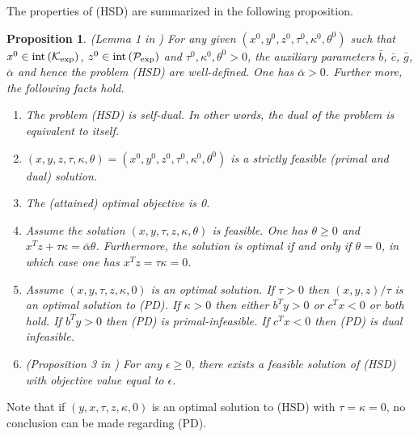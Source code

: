 \documentclass[10pt]{article}
\theoremstyle{definition}
\theoremstyle{plain}
\newtheorem{prop}{Proposition}
\def\interior{\protect{\textnormal{int}}}
\begin{document}
The properties of (HSD) are summarized in the following proposition.
\begin{prop}\label{properties_HSD} \textnormal{(Lemma 1 in \cite{Freund_behavior_HSD})}
	For any given $(x^0, y^0, z^0, \tau^0, \kappa^0, \theta^0)$ such that $x^0 \in \interior \left(\mathcal{K}_{\exp}\right)$, $z^0 \in \interior \left(\mathcal{P}_{\exp}\right)$ and $\tau^0, \kappa^0, \theta^0 > 0$, the auxiliary parameters $\bar{b}$, $\bar{c}$, $\bar{g}$, $\bar{\alpha}$ and hence the problem (HSD) are well-defined. One has $\bar{\alpha}>0$. Further more, the following facts hold.
	\begin{enumerate}
		\item The problem (HSD) is \textnormal{self-dual}. In other words, the dual of the problem is equivalent to itself. 
		\item $(x,y,z,\tau,\kappa, \theta) = (x^0,y^0,z^0, \tau^0,\kappa^0, \theta^0)$ is a strictly feasible (primal and dual) solution.
		\item The (attained) optimal objective is 0. 
		\item Assume the solution $(x,y, \tau, z,\kappa, \theta)$ is feasible. One has $\theta\geq 0$ and $x^T z + \tau \kappa = \bar{\alpha} \theta$. Furthermore, the solution is optimal if and only if $\theta=0$, in which case one has $x^T z = \tau\kappa = 0$.
		\item Assume $(x,y, \tau, z,\kappa, 0)$ is an optimal solution. If $\tau>0$ then $(x,y,z)/\tau$ is an optimal solution to (PD). If $\kappa>0$ then either $b^Ty>0$ or $c^Tx<0$ or 	
		both hold. 
		\subitem If $b^T y>0$ then (PD) is primal-infeasible.
		\subitem If $c^T x < 0$ then (PD) is dual infeasible.
		\item \textnormal{(Proposition 3 in \cite{Freund_behavior_HSD})} For any $\epsilon \geq 0$, there exists a feasible solution of (HSD) with objective value equal to $\epsilon$.
	\end{enumerate}
\end{prop} 
Note that if $(y,x,\tau,z,\kappa,0)$ is an optimal solution to (HSD) with $\tau=\kappa=0$, no conclusion can be made regarding  (PD). \\
\end{document}
